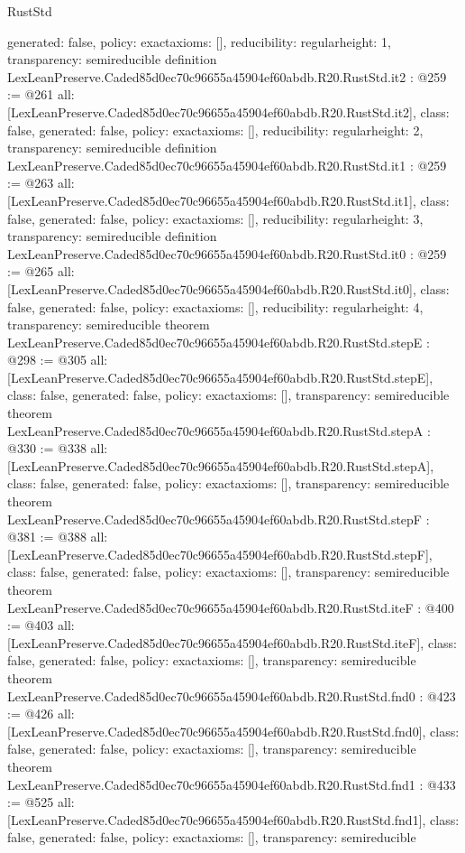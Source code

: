 \begin{lexlean}{RustStd}
\begin{coremodule}
{  generated: false,
  policy: exact{axioms: []},
  reducibility: regular{height: 1},
  transparency: semireducible
}
definition LexLeanPreserve.Caded85d0ec70c96655a45904ef60abdb.R20.RustStd.it2 : @259 := @261 {
  all: [LexLeanPreserve.Caded85d0ec70c96655a45904ef60abdb.R20.RustStd.it2],
  class: false,
  generated: false,
  policy: exact{axioms: []},
  reducibility: regular{height: 2},
  transparency: semireducible
}
definition LexLeanPreserve.Caded85d0ec70c96655a45904ef60abdb.R20.RustStd.it1 : @259 := @263 {
  all: [LexLeanPreserve.Caded85d0ec70c96655a45904ef60abdb.R20.RustStd.it1],
  class: false,
  generated: false,
  policy: exact{axioms: []},
  reducibility: regular{height: 3},
  transparency: semireducible
}
definition LexLeanPreserve.Caded85d0ec70c96655a45904ef60abdb.R20.RustStd.it0 : @259 := @265 {
  all: [LexLeanPreserve.Caded85d0ec70c96655a45904ef60abdb.R20.RustStd.it0],
  class: false,
  generated: false,
  policy: exact{axioms: []},
  reducibility: regular{height: 4},
  transparency: semireducible
}
theorem LexLeanPreserve.Caded85d0ec70c96655a45904ef60abdb.R20.RustStd.stepE : @298 := @305 {
  all: [LexLeanPreserve.Caded85d0ec70c96655a45904ef60abdb.R20.RustStd.stepE],
  class: false,
  generated: false,
  policy: exact{axioms: []},
  transparency: semireducible
}
theorem LexLeanPreserve.Caded85d0ec70c96655a45904ef60abdb.R20.RustStd.stepA : @330 := @338 {
  all: [LexLeanPreserve.Caded85d0ec70c96655a45904ef60abdb.R20.RustStd.stepA],
  class: false,
  generated: false,
  policy: exact{axioms: []},
  transparency: semireducible
}
theorem LexLeanPreserve.Caded85d0ec70c96655a45904ef60abdb.R20.RustStd.stepF : @381 := @388 {
  all: [LexLeanPreserve.Caded85d0ec70c96655a45904ef60abdb.R20.RustStd.stepF],
  class: false,
  generated: false,
  policy: exact{axioms: []},
  transparency: semireducible
}
theorem LexLeanPreserve.Caded85d0ec70c96655a45904ef60abdb.R20.RustStd.iteF : @400 := @403 {
  all: [LexLeanPreserve.Caded85d0ec70c96655a45904ef60abdb.R20.RustStd.iteF],
  class: false,
  generated: false,
  policy: exact{axioms: []},
  transparency: semireducible
}
theorem LexLeanPreserve.Caded85d0ec70c96655a45904ef60abdb.R20.RustStd.fnd0 : @423 := @426 {
  all: [LexLeanPreserve.Caded85d0ec70c96655a45904ef60abdb.R20.RustStd.fnd0],
  class: false,
  generated: false,
  policy: exact{axioms: []},
  transparency: semireducible
}
theorem LexLeanPreserve.Caded85d0ec70c96655a45904ef60abdb.R20.RustStd.fnd1 : @433 := @525 {
  all: [LexLeanPreserve.Caded85d0ec70c96655a45904ef60abdb.R20.RustStd.fnd1],
  class: false,
  generated: false,
  policy: exact{axioms: []},
  transparency: semireducible
}
\end{coremodule}
\end{lexlean}
